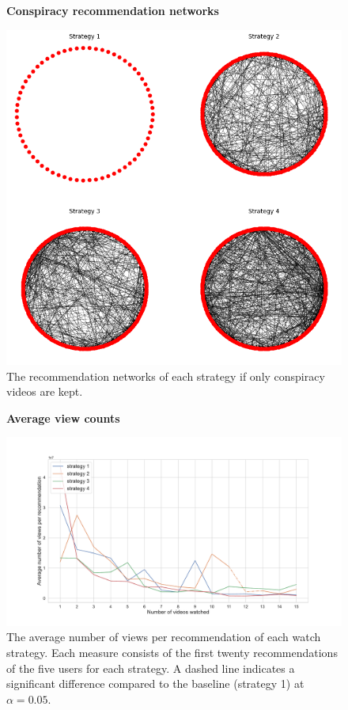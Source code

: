 
\begin{appendices}
\setcounter{table}{1}
\setcounter{figure}{0}

\begin{figure}[h]
  \textbf{Conspiracy recommendation networks}\par\medskip
  \centering
  \includegraphics[keepaspectratio, width=\textwidth]{images/conspiracy networks.png}
  \caption{The recommendation networks of each strategy if only conspiracy videos are kept.}
  \label{appendix:networks}
\end{figure}

\begin{figure}
  \textbf{Average view counts}\par\medskip
  \centering
  \includegraphics[keepaspectratio, width=\textwidth]{images/views.pdf}
  \caption{The average number of views per recommendation of each watch strategy. Each measure consists of the first twenty recommendations of the five users for each strategy. A dashed line indicates a significant difference compared to the baseline (strategy 1) at $\alpha = 0.05$.}
  \label{appendix:views}
\end{figure}



\end{appendices}
